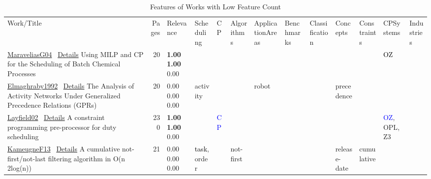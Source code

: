{\scriptsize
\begin{longtable}{>{\raggedright\arraybackslash}p{3cm}r>{\raggedright\arraybackslash}p{1.0cm}>{\raggedright\arraybackslash}p{ 1.50cm}>{\raggedright\arraybackslash}p{ 1.50cm}>{\raggedright\arraybackslash}p{ 1.50cm}>{\raggedright\arraybackslash}p{ 1.50cm}>{\raggedright\arraybackslash}p{ 1.50cm}>{\raggedright\arraybackslash}p{ 1.50cm}>{\raggedright\arraybackslash}p{ 1.50cm}>{\raggedright\arraybackslash}p{ 1.50cm}>{\raggedright\arraybackslash}p{ 1.50cm}>{\raggedright\arraybackslash}p{ 1.50cm}}
\rowcolor{white}\caption{Features of Works with Low Feature Count}\\ \toprule
\rowcolor{white}Work/Title & Pages & Relevance & Scheduling& CP& Algorithms& ApplicationAreas& Benchmarks& Classification& Concepts& Constraints& CPSystems& Industries\\ \midrule\endhead
\bottomrule
\endfoot
\href{../scheduling/works/MaraveliasG04.pdf}{MaraveliasG04}~\cite{MaraveliasG04} \hyperref[detail:MaraveliasG04]{Details} Using {MILP} and {CP} for the Scheduling of Batch Chemical Processes & 20 & \noindent{}\textbf{1.00} \textbf{1.00} \textcolor{black!50}{0.00} &  &  &  &  &  &  &  &  & \textcolor{black}{OZ} & \\
\href{../scheduling/works/Elmaghraby1992.pdf}{Elmaghraby1992}~\cite{Elmaghraby1992} \hyperref[detail:Elmaghraby1992]{Details} The Analysis of Activity Networks Under Generalized Precedence Relations (GPRs) & 20 & \noindent{}\textcolor{black!50}{0.00} \textcolor{black!50}{0.00} \textcolor{black!50}{0.00} & \textcolor{black!40}{activity} &  &  & \textcolor{black!40}{robot} &  &  & \textcolor{black!40}{precedence} &  &  & \\
\href{../scheduling/works/Layfield02.pdf}{Layfield02}~\cite{Layfield02} \hyperref[detail:Layfield02]{Details} A constraint programming pre-processor for duty scheduling & 230 & \noindent{}\textbf{1.00} \textbf{1.00} \textcolor{black!50}{0.00} &  & \textcolor{blue}{CP} &  &  &  &  &  &  & \textcolor{blue}{OZ}, \textcolor{black!40}{OPL}, \textcolor{black!40}{Z3} & \\
\href{../scheduling/works/KameugneF13.pdf}{KameugneF13}~\cite{KameugneF13} \hyperref[detail:KameugneF13]{Details} A cumulative not-first/not-last filtering algorithm in O(n 2log(n)) & 21 & \noindent{}\textcolor{black!50}{0.00} \textcolor{black!50}{0.00} \textcolor{black!50}{0.00} & \textcolor{black}{task}, \textcolor{black!40}{order} &  & \textcolor{black!40}{not-first} &  &  &  & \textcolor{black!40}{release-date} & \textcolor{black!40}{cumulative} &  & \\

\end{longtable}}
